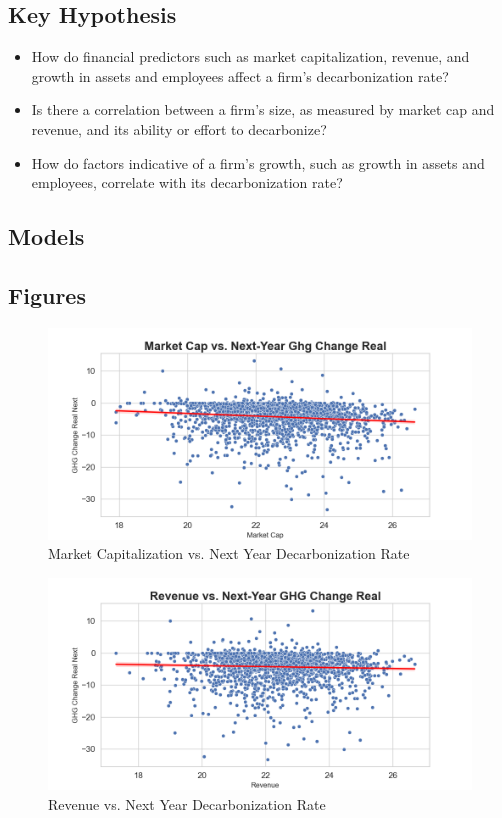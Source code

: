 \subsection{Key Hypothesis}
\begin{itemize}
    \item How do financial predictors such as market capitalization, revenue, and growth in assets and employees affect a firm's decarbonization rate?
    \item Is there a correlation between a firm's size, as measured by market cap and revenue, and its ability or effort to decarbonize?
    \item How do factors indicative of a firm's growth, such as growth in assets and employees, correlate with its decarbonization rate?
\end{itemize}

\subsection{Models} 




\subsection{Figures}
\begin{figure}[H]
\centering
  \includegraphics[width=\textwidth]{figures/market_cap_vs_ghg_change_real_next.png}
\caption{Market Capitalization vs. Next Year Decarbonization Rate}
\label{fig:market_cap_vs_ghg_change_real_next}
\end{figure}

\begin{figure}[H]
\centering
  \includegraphics[width=\textwidth]{figures/revenue_vs_ghg_change_real_next.png}
\caption{Revenue vs. Next Year Decarbonization Rate}
\label{fig:revenue_vs_ghg_change_real_next}
\end{figure}

